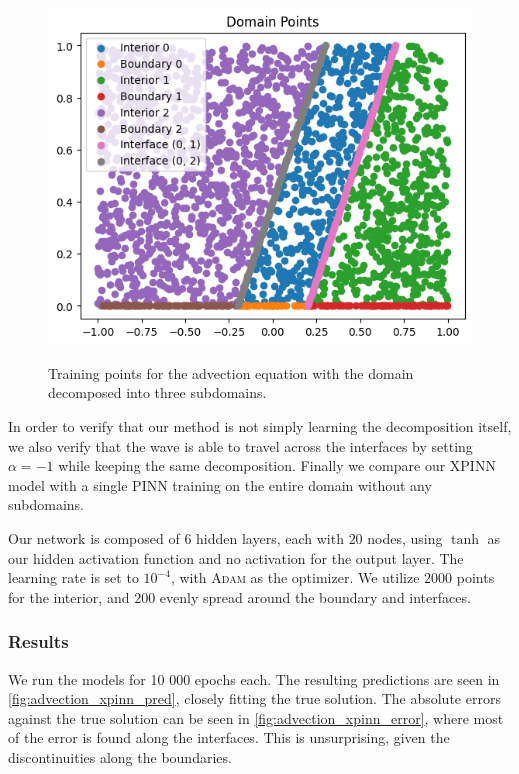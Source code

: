 \begin{figure}[h]
    \centering
    \includegraphics[width=0.8\linewidth]{Project1XPINNs/figures/advection/advection_decomp.png}
    \label{subfig:single}
    \caption{Training points for the advection equation with the domain decomposed into three subdomains.}
    \label{fig:decomp_advection}
\end{figure}

In order to verify that our method is not simply learning the decomposition itself, we also verify that the wave is able to travel across the interfaces by setting $\alpha = -1$ while keeping the same decomposition.
Finally we compare our XPINN model with a single PINN training on the entire domain without any subdomains. 

Our network is composed of $6$ hidden layers, each with $20$ nodes, using $\tanh$ as our hidden activation function and no activation for the output layer. The learning rate is set to $10^{-4}$, with \textsc{Adam} as the optimizer.
We utilize $2000$ points for the interior, and $200$ evenly spread around the boundary and interfaces. 

\subsubsection{Results}
We run the models for 10 000 epochs each.
The resulting predictions are seen in \autoref{fig:advection_xpinn_pred}, closely fitting the true solution.
The absolute errors against the true solution can be seen in \autoref{fig:advection_xpinn_error}, where most of the error is found along the interfaces.
This is unsurprising, given the discontinuities along the boundaries.



